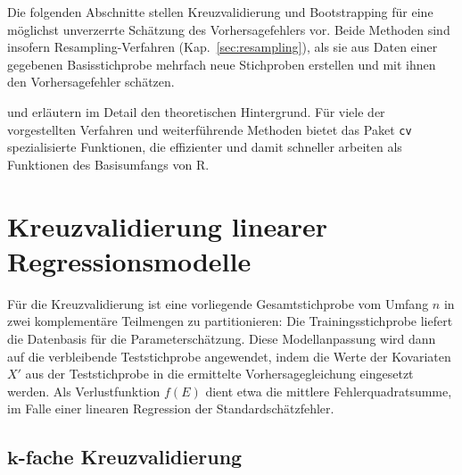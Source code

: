 Die folgenden Abschnitte stellen Kreuzvalidierung und Bootstrapping für eine möglichst unverzerrte Schätzung des Vorhersagefehlers vor. Beide Methoden sind insofern Resampling-Verfahren (Kap.\ \ref{sec:resampling}), als sie aus Daten einer gegebenen Basisstichprobe mehrfach neue Stichproben erstellen und mit ihnen den Vorhersagefehler schätzen.

 und  erläutern im Detail den theoretischen Hintergrund. Für viele der vorgestellten Verfahren und weiterführende Methoden bietet das Paket  \lstinline!cv! \cite{Fox2024} spezialisierte Funktionen, die effizienter und damit schneller arbeiten als Funktionen des Basisumfangs von R.

\section{Kreuzvalidierung linearer Regressionsmodelle}
\label{sec:regrCV}

Für die Kreuzvalidierung ist eine vorliegende Gesamtstichprobe vom Umfang $n$ in zwei komplementäre Teilmengen zu partitionieren: Die Trainingsstichprobe liefert die Datenbasis für die Parameterschätzung. Diese Modellanpassung wird dann auf die verbleibende Teststichprobe angewendet, indem die Werte der Kovariaten $X'$ aus der Teststichprobe in die ermittelte Vorhersagegleichung eingesetzt werden. Als Verlustfunktion $f(E)$ dient etwa die mittlere Fehlerquadratsumme, im Falle einer linearen Regression der Standardschätzfehler.

\subsection[\texorpdfstring{$k$}{k}-fache Kreuzvalidierung]{$\bm{k}$-fache Kreuzvalidierung}
\label{sec:kfoldCV}


